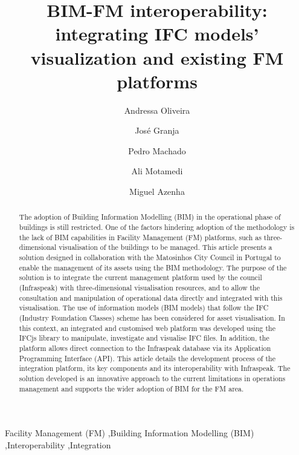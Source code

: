 \documentclass[preprint,12pt]{elsarticle}
\begin{document}
\tableofcontents

\newpage

\begin{frontmatter}

\title{BIM-FM interoperability: integrating IFC models' visualization and existing FM platforms}

\author[inst1]{Andressa Oliveira}
\author[inst1]{José Granja}
\author[inst2]{Pedro Machado}
\author[inst3]{Ali Motamedi}
\author[inst1]{Miguel Azenha}



        
\begin{abstract}
The adoption of Building Information Modelling (BIM) in the operational phase of buildings is still restricted. One of the factors hindering adoption of the methodology is the lack of BIM capabilities in Facility Management (FM) platforms, such as three-dimensional visualisation of the buildings to be managed. This article presents a solution designed in collaboration with the Matosinhos City Council in Portugal to enable the management of its assets using the BIM methodology. The purpose of the solution is to integrate the current management platform used by the council (Infraspeak) with three-dimensional visualisation resources, and to allow the consultation and manipulation of operational data directly and integrated with this visualisation. The use of information models (BIM models) that follow the IFC (Industry Foundation Classes) scheme has been considered for asset visualisation. In this context, an integrated and customised web platform was developed using the IFCjs library to manipulate, investigate and visualise IFC files. In addition, the platform allows direct connection to the Infraspeak database via its Application Programming Interface (API). This article details the development process of the integration platform, its key components and its interoperability with Infraspeak. The solution developed is an innovative approach to the current limitations in operations management and supports the wider adoption of BIM for the FM area.
\end{abstract}

\begin{keyword}
Facility Management (FM) \sep Building Information Modelling (BIM) \sep Interoperability \sep Integration
\end{keyword}

\end{frontmatter}
\end{document}
